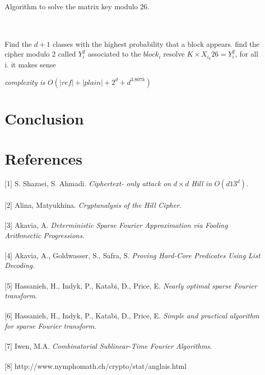 \documentclass{article}
\begin{document}
Algorithm to solve the matrix key modulo 26.\\
\\
\begin{algorithmic}[1]
\\
\STATE Find the $d+1$ classes with the highest probability that a block appears.
	\STATE find the cipher modulo 2 called $Y_{i}^2$ associated to the $block_{i}$
\ENDFOR
	\REPEAT
	\STATE resolve $ K \times X_{i_{k}}{26} =Y_{i}^2$, for all i.
	\UNTIL it makes sense
\end{algorithmic}
\textit{complexity is $O(|ref| + |plain| + 2^{d} + d^{3.807 k})$}

\newpage
\section*{Conclusion}

\newpage
\section*{References}
[1] S. Shazaei, S. Ahmadi. \textit{Ciphertext- only attack on} $d \times d$ \textit{Hill in} $O(d13^d)$.\\
\\[0pt]
[2] Alina, Matyukhina. \textit{Cryptanalysis of the Hill Cipher}.\\
\\[0pt]
[3] Akavia, A. \textit{Deterministic Sparse Fourier Approximation via Fooling Arithmectic Progressions}.\\
\\[0pt]
[4] Akavia, A., Goldwasser, S., Safra, S. \textit{Proving Hard-Core Predicates Using List Decoding}.\\
\\[0pt]
[5] Hassanieh, H., Indyk, P., Katabi, D., Price, E. \textit{Nearly optimal sparse Fourier transform}.\\
\\[0pt]
[6] Hassanieh, H., Indyk, P., Katabi, D., Price, E. \textit{Simple and practical algorithm for sparse Fourier transform}.\\
\\[0pt]
[7] Iwen, M.A. \textit{Combinatorial Sublinear-Time Fourier Algorithms}.\\
\\[0pt]
[8] http://www.nymphomath.ch/crypto/stat/anglais.html\\
\end{document}
